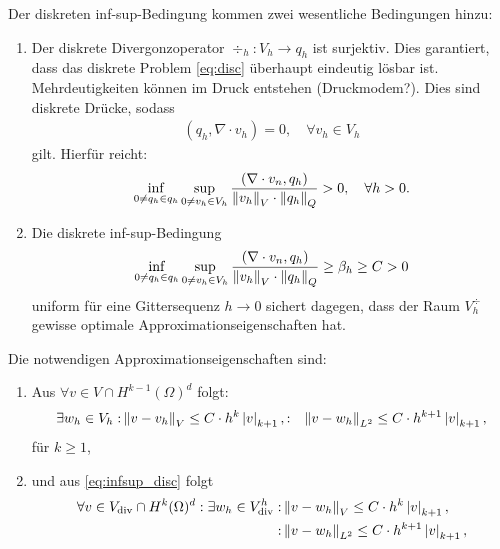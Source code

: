 \begin{bemerkung}
  Der diskreten inf-sup-Bedingung kommen zwei wesentliche Bedingungen hinzu:
  \begin{enumerate}
  \item Der diskrete Divergonzoperator $\div_{h}: V_{h} \to q_{h}$ ist surjektiv. Dies garantiert, dass das diskrete Problem \eqref{eq:disc} überhaupt eindeutig lösbar ist. Mehrdeutigkeiten können im Druck entstehen (Druckmodem?). Dies sind diskrete Drücke, sodass
    \begin{align*}
      (q_{h}, \nabla \cdot v_{h}) = 0, \quad \forall v_{h} \in V_{h}
    \end{align*}
gilt. Hierfür reicht:
\begin{align}\label{eq:infsup_disc_sim}
  \inf_{0 \neq q_{h} \in q_{h}} \sup_{0 \neq v_{h} \in V_{h}}\frac{(\nabla \cdot v_{n}, q_{h})}{\left \|v_{h} \right\|_{V}\cdot \left \|q_{h} \right\|_{Q}} > 0, \quad \forall h > 0.
\end{align}
\item Die diskrete inf-sup-Bedingung
  \begin{align}\label{eq:infsup_disc}
      \inf_{0 \neq q_{h} \in q_{h}} \sup_{0 \neq v_{h} \in V_{h}}\frac{(\nabla \cdot v_{n}, q_{h})}{\left \|v_{h} \right\|_{V}\cdot \left \|q_{h} \right\|_{Q}} \geq \beta_{h}\geq C > 0
  \end{align}
uniform für eine Gittersequenz $h \to 0$
sichert dagegen, dass der Raum $V_{h}^{\div}$ gewisse optimale Approximationseigenschaften hat. 
\end{enumerate}

Die notwendigen Approximationseigenschaften sind:
\begin{enumerate}
\item Aus $\forall v \in V \cap H^{k-1} (\Omega)^{d}$ folgt:
    \begin{align*}
      \exists w_{h} \in V_{h} :&\left \|v - v_{h} \right\|_{V} \leq C \cdot h^{k}\left|v\right|_{k+1}, 
      :& \left \|v - w_{h} \right\|_{L^{2}} \leq C \cdot h^{k+1}\left|v\right|_{k+1}, 
    \end{align*}
für $k \geq 1$, 
\item und aus \eqref{eq:infsup_disc} folgt
  \begin{align*}
    \forall v \in V_{\operatorname{div}} \cap H^{k}(\Omega)^{d}: \exists w_{h} \in V_{\operatorname{div}}^{h}: 
&\left \|v - w_{h} \right\|_{V} \leq C \cdot h^{k}\left|v\right|_{k+1}, \\
      :& \left \|v - w_{h} \right\|_{L^{2}} \leq C \cdot h^{k+1}\left|v\right|_{k+1}, 
  \end{align*}
\end{enumerate}
\end{bemerkung}
